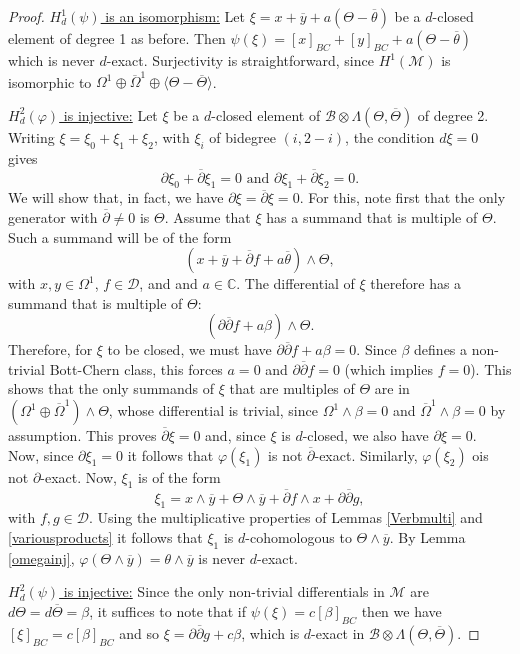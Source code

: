 \documentclass[a4paper]{amsart}
\theoremstyle{definition}
\newcommand{\CC}{\mathbb{C}}
\newcommand{\Bb}{\mathcal{B}}
\newcommand{\Dd}{\mathcal{D}}
\newcommand{\Mm}{\mathcal{M}}
\newcommand{\ov}{\overline}
\newcommand{\del}{\partial}
\newcommand{\delb}{{\overline\partial}}
\begin{document}
\begin{proof}
\underline{$H^1_d(\psi)$ is an isomorphism:}
Let $\xi=x+\ov y+a(\Theta-\ov\theta)$ be a $d$-closed element of degree 1 as before. Then $\psi(\xi)=[x]_{BC}+[y]_{BC}+a(\Theta-\ov\theta)$ which is never $d$-exact. Surjectivity is straightforward, since
$H^1(\Mm)$ is isomorphic to $\Omega^1\oplus \ov\Omega^1\oplus \langle\Theta-\ov\Theta\rangle$.

\underline{$H^2_d(\varphi)$ is injective:} Let $\xi$ be a $d$-closed element of $\Bb\otimes\Lambda(\Theta,\ov\Theta)$ of degree 2.
Writing $\xi=\xi_0+\xi_1+\xi_2$, with $\xi_i$ of bidegree $(i,2-i)$, the condition $d\xi=0$ gives
\[\del \xi_0+\delb \xi_1=0\text{ and }\del \xi_1+\delb \xi_2=0.\]
We will show that, in fact, we have $\del \xi=\delb\xi=0$.
For this, note first that the only generator with $\delb\neq 0$ is $\Theta$. Assume that $\xi$ has a summand that is multiple of $\Theta$. Such a summand will be of the form
\[(x+\ov y+\delb f+a\ov\theta)\wedge\Theta,\]
with $x,y\in\Omega^1$, $f\in\Dd$, and  and $a\in\CC$.
The differential of $\xi$ therefore has a summand that is multiple of $\Theta$:
\[(\del\delb f+a\beta)\wedge\Theta.\]
Therefore, for $\xi$ to be closed, we must have $\del\delb f+a\beta=0$. Since
 $\beta$ defines a non-trivial Bott-Chern class, this forces $a=0$ and $\del\delb f=0$ (which implies $f=0$). This shows that the only summands of $\xi$ that are multiples of $\Theta$ are in $(\Omega^1\oplus\ov\Omega^1)\wedge\Theta$, whose differential is trivial, since
 $\Omega^1\wedge\beta=0$ and $\ov\Omega^1\wedge \beta=0$ by assumption.
 This proves $\delb\xi=0$ and, since $\xi$ is $d$-closed, we also have $\del\xi=0$.
 Now, since $\del\xi_1=0$ it follows that $\varphi(\xi_1)$ is not $\delb$-exact. Similarly, $\varphi(\xi_2)$ ois not $\del$-exact.
 Now, $\xi_1$ is of the form
 \[\xi_1=x\wedge \ov y+\Theta\wedge \ov y+\delb f\wedge x+\del\delb g,\]
 with $f,g\in \Dd$. Using the multiplicative properties of Lemmas \ref{Verbmulti} and \ref{variousproducts} it follows that $\xi_1$ is $d$-cohomologous to
 $\Theta\wedge \ov y$. By Lemma \ref{omegainj}, $\varphi(\Theta\wedge \ov y)=\theta\wedge\ov y$ is never $d$-exact.

\underline{$H^2_d(\psi)$ is injective:}  Since the only non-trivial differentials in $\Mm$ are $d\Theta=d\ov\Theta=\beta$, it suffices to note that if $\psi(\xi)=c[\beta]_{BC}$ then we have $[\xi]_{BC}=c[\beta]_{BC}$ and so $\xi=\del\delb g+c\beta$, which is $d$-exact in $\Bb\otimes\Lambda(\Theta,\ov\Theta)$.
\end{proof}
\end{document}
